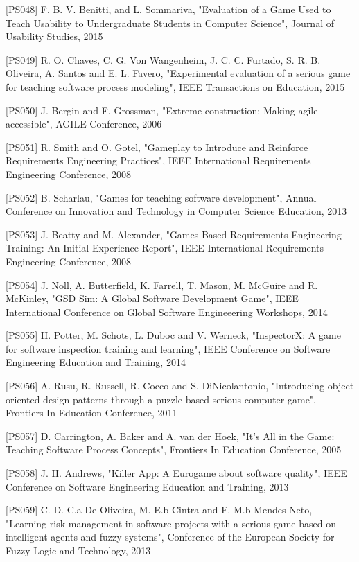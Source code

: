 [PS048]	F. B. V. Benitti, and L. Sommariva, "Evaluation of a Game Used to Teach Usability to Undergraduate Students in Computer Science", Journal of Usability Studies, 2015

[PS049]	R. O. Chaves, C. G. Von Wangenheim, J. C. C. Furtado, S. R. B. Oliveira, A. Santos and E. L. Favero, "Experimental evaluation of a serious game for teaching software process modeling", IEEE Transactions on Education, 2015

[PS050]	J. Bergin and F. Grossman, "Extreme construction: Making agile accessible", AGILE Conference, 2006

[PS051]	R. Smith and O. Gotel, "Gameplay to Introduce and Reinforce Requirements Engineering Practices", IEEE International Requirements Engineering Conference, 2008

[PS052]	B. Scharlau, "Games for teaching software development", Annual Conference on Innovation and Technology in Computer Science Education, 2013

[PS053]	J. Beatty and M. Alexander, "Games-Based Requirements Engineering Training: An Initial Experience Report", IEEE International Requirements Engineering Conference, 2008

[PS054]	J. Noll, A. Butterfield, K. Farrell, T. Mason, M. McGuire and R. McKinley, "GSD Sim: A Global Software Development Game", IEEE International Conference on Global Software Engineeering Workshops, 2014

[PS055]	H. Potter, M. Schots, L. Duboc and V. Werneck, "InspectorX: A game for software inspection training and learning", IEEE Conference on Software Engineering Education and Training, 2014

[PS056]	A. Rusu, R. Russell, R. Cocco and S. DiNicolantonio, "Introducing object oriented design patterns through a puzzle-based serious computer game", Frontiers In Education Conference, 2011

[PS057]	D. Carrington, A. Baker and A. van der Hoek, "It's All in the Game: Teaching Software Process Concepts", Frontiers In Education Conference, 2005

[PS058]	J. H. Andrews, "Killer App: A Eurogame about software quality", IEEE Conference on Software Engineering Education and Training, 2013

[PS059]	C. D. C.a De Oliveira, M. E.b Cintra and F. M.b Mendes Neto, "Learning risk management in software projects with a serious game based on intelligent agents and fuzzy systems", Conference of the European Society for Fuzzy Logic and Technology, 2013

